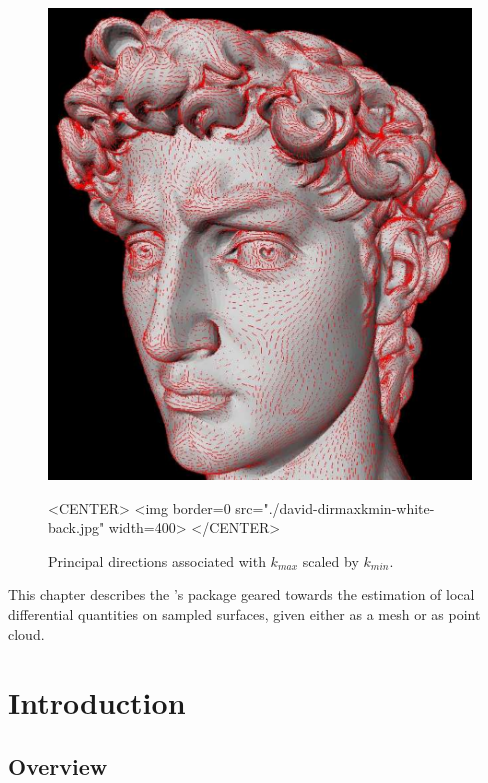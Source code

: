 


\begin{figure}[!ht]
\begin{ccTexOnly}
\centerline{
\includegraphics[width=.5\linewidth]{Jet_fitting_3/david-dirmaxkmin-jpg-white-back}}
\end{ccTexOnly}
\caption{Principal directions associated with $k_{max}$ scaled by $k_{min}$.}

\begin{ccHtmlOnly}
<CENTER> <img border=0 src="./david-dirmaxkmin-white-back.jpg" width=400>
</CENTER>
\end{ccHtmlOnly}
\end{figure}

This chapter describes the \cgal's package geared towards the
estimation of local differential quantities on sampled surfaces, given
either as a mesh or as point cloud.


\section{Introduction}
\label{sec:intro}

\subsection{Overview}

